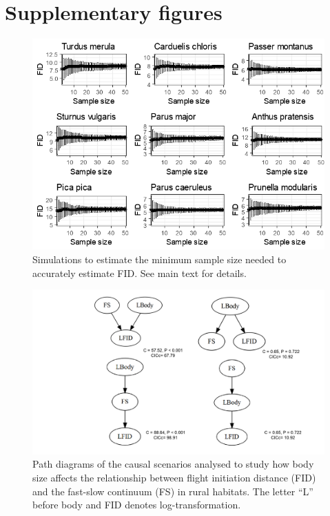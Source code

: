 \section*{Supplementary figures}

\begin{figure}[ht!]
\includegraphics[width=\textwidth]{./Figures/Appendix4_1/Fig_1.png}
\caption[Effects of the sample size on FID estimates]{
Simulations to estimate the minimum sample size needed to accurately estimate
FID. See main text for details.}\label{fig:figApp4.1}
\end{figure}


\begin{figure}
\includegraphics[width=\textwidth]{./Figures/Appendix4_1/Fig_2.png}
\caption[Path analysis with body size for rural habitats]{
Path diagrams of the causal scenarios analysed to study how body size affects
the relationship between flight initiation distance (FID) and the fast-slow
continuum (FS) in rural habitats. The letter “L” before body and FID
denotes log-transformation.}\label{fig:figApp4.2}
\end{figure}



